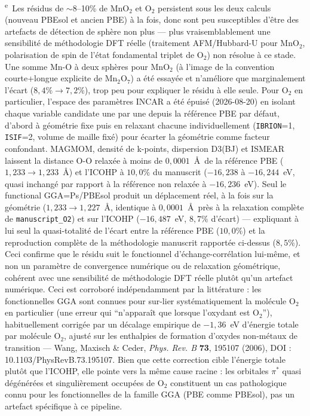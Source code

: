 \noindent\textsuperscript{e}~Les résidus de $\sim$8--10\% de MnO$_2$ et O$_2$ persistent sous les deux calculs (nouveau PBEsol et ancien PBE) à la fois, donc sont peu susceptibles d'être des artefacts de détection de sphère non plus --- plus vraisemblablement une sensibilité de méthodologie DFT réelle (traitement AFM/Hubbard-U pour MnO$_2$, polarisation de spin de l'état fondamental triplet de O$_2$) non résolue à ce stade. Une somme Mn-O à deux sphères pour MnO$_2$ (à l'image de la convention courte+longue explicite de Mn$_2$O$_7$) a été essayée et n'améliore que marginalement l'écart ($8{,}4\%\to7{,}2\%$), trop peu pour expliquer le résidu à elle seule. Pour O$_2$ en particulier, l'espace des paramètres INCAR a été épuisé (2026-08-20) en isolant chaque variable candidate une par une depuis la référence PBE par défaut, d'abord à géométrie fixe puis en relaxant chacune individuellement (\texttt{IBRION}=1, \texttt{ISIF}=2, volume de maille fixé) pour écarter la géométrie comme facteur confondant. MAGMOM, densité de k-points, dispersion D3(BJ) et ISMEAR laissent la distance O-O relaxée à moins de $0{,}0001$~\AA\ de la référence PBE ($1{,}233\to1{,}233$~\AA) et l'ICOHP à $10{,}0\%$ du manuscrit ($-16{,}238$ à $-16{,}244$~eV, quasi inchangé par rapport à la référence non relaxée à $-16{,}236$~eV). Seul le functional GGA=Ps/PBEsol produit un déplacement réel, à la fois sur la géométrie ($1{,}233\to1{,}227$~\AA, identique à $0{,}0001$~\AA\ près à la relaxation complète de \texttt{manuscript\_O2}) et sur l'ICOHP ($-16{,}487$~eV, $8{,}7\%$ d'écart) --- expliquant à lui seul la quasi-totalité de l'écart entre la référence PBE ($10{,}0\%$) et la reproduction complète de la méthodologie manuscrit rapportée ci-dessus ($8{,}5\%$). Ceci confirme que le résidu suit le fonctionnel d'échange-corrélation lui-même, et non un paramètre de convergence numérique ou de relaxation géométrique, cohérent avec une sensibilité de méthodologie DFT réelle plutôt qu'un artefact numérique. Ceci est corroboré indépendamment par la littérature : les fonctionnelles GGA sont connues pour sur-lier systématiquement la molécule O$_2$ en particulier (une erreur qui ``n'apparaît que lorsque l'oxydant est O$_2$''), habituellement corrigée par un décalage empirique de $-1{,}36$~eV d'énergie totale par molécule O$_2$, ajusté sur les enthalpies de formation d'oxydes non-métaux de transition --- Wang, Maxisch \& Ceder, \emph{Phys. Rev. B} \textbf{73}, 195107 (2006), DOI : 10.1103/PhysRevB.73.195107. Bien que cette correction cible l'énergie totale plutôt que l'ICOHP, elle pointe vers la même cause racine : les orbitales $\pi^*$ quasi dégénérées et singulièrement occupées de O$_2$ constituent un cas pathologique connu pour les fonctionnelles de la famille GGA (PBE comme PBEsol), pas un artefact spécifique à ce pipeline.

